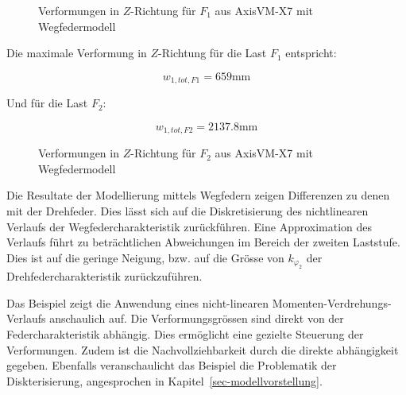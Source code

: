\documentclass[
  11pt,
  letterpaper,
]{scrreprt}
\begin{document}
\begin{figure}[H]


\caption{\label{fig-f1-wegfeder}Verformungen in \(Z\)-Richtung für
\(F_1\) aus AxisVM-X7 mit Wegfedermodell}

\end{figure}%

Die maximale Verformung in \(Z\)-Richtung für die Last \(F_1\)
entspricht:

\[
w_{1,tot,F1} = 659 \text{mm}
\]

Und für die Last \(F_2\):

\[
w_{1,tot,F2} = 2137.8 \text{mm}
\]

\begin{figure}[H]


\caption{\label{fig-f2-wegfeder}Verformungen in \(Z\)-Richtung für
\(F_2\) aus AxisVM-X7 mit Wegfedermodell}

\end{figure}%

Die Resultate der Modellierung mittels Wegfedern zeigen Differenzen zu
denen mit der Drehfeder. Dies lässt sich auf die Diskretisierung des
nichtlinearen Verlaufs der Wegfedercharakteristik zurückführen. Eine
Approximation des Verlaufs führt zu beträchtlichen Abweichungen im
Bereich der zweiten Laststufe. Dies ist auf die geringe Neigung, bzw.
auf die Grösse von \(k_{\varphi_2}\) der Drehfedercharakteristik
zurückzuführen.

Das Beispiel zeigt die Anwendung eines nicht-linearen
Momenten-Verdrehungs-Verlaufs anschaulich auf. Die Verformungsgrössen
sind direkt von der Federcharakteristik abhängig. Dies ermöglicht eine
gezielte Steuerung der Verformungen. Zudem ist die Nachvollziehbarkeit
durch die direkte abhängigkeit gegeben. Ebenfalls veranschaulicht das
Beispiel die Problematik der Diskterisierung, angesprochen in
Kapitel~\ref{sec-modellvorstellung}.
\end{document}
